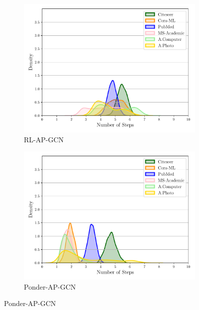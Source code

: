 \documentclass{gdl}
\begin{document}
\begin{figure}[p]
\begin{minipage}[t]{0.48\textwidth}
        \begin{subfigure}[b]{0.8\textwidth}
            \centering
            \includegraphics[width=\textwidth]{RL-AP-GCN_steps_distribution.pdf}
            \captionsetup{justification=centerlast}
            \caption{RL-AP-GCN}
            \label{fig:step_dist_RL_AP_GCN}
        \end{subfigure}
        
        \begin{subfigure}[b]{0.8\textwidth}
            \centering
            \includegraphics[width=\textwidth]{Ponder-AP-GCN_steps_distribution.pdf}
            \captionsetup{justification=centerlast}
            \caption{Ponder-AP-GCN}
            \label{fig:step_dist_Ponder_AP_GCN}
        \end{subfigure}
        

\end{minipage}
\end{figure}
\end{document}
